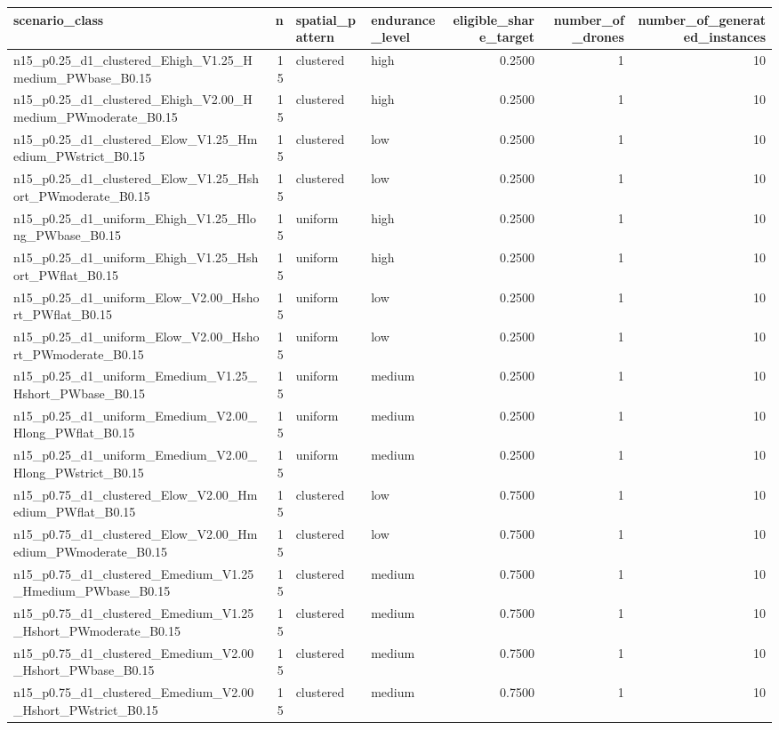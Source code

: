 \begin{tabular}{lrllrrr}
\toprule
scenario_class & n & spatial_pattern & endurance_level & eligible_share_target & number_of_drones & number_of_generated_instances \\
\midrule
n15_p0.25_d1_clustered_Ehigh_V1.25_Hmedium_PWbase_B0.15 & 15 & clustered & high & 0.2500 & 1 & 10 \\
n15_p0.25_d1_clustered_Ehigh_V2.00_Hmedium_PWmoderate_B0.15 & 15 & clustered & high & 0.2500 & 1 & 10 \\
n15_p0.25_d1_clustered_Elow_V1.25_Hmedium_PWstrict_B0.15 & 15 & clustered & low & 0.2500 & 1 & 10 \\
n15_p0.25_d1_clustered_Elow_V1.25_Hshort_PWmoderate_B0.15 & 15 & clustered & low & 0.2500 & 1 & 10 \\
n15_p0.25_d1_uniform_Ehigh_V1.25_Hlong_PWbase_B0.15 & 15 & uniform & high & 0.2500 & 1 & 10 \\
n15_p0.25_d1_uniform_Ehigh_V1.25_Hshort_PWflat_B0.15 & 15 & uniform & high & 0.2500 & 1 & 10 \\
n15_p0.25_d1_uniform_Elow_V2.00_Hshort_PWflat_B0.15 & 15 & uniform & low & 0.2500 & 1 & 10 \\
n15_p0.25_d1_uniform_Elow_V2.00_Hshort_PWmoderate_B0.15 & 15 & uniform & low & 0.2500 & 1 & 10 \\
n15_p0.25_d1_uniform_Emedium_V1.25_Hshort_PWbase_B0.15 & 15 & uniform & medium & 0.2500 & 1 & 10 \\
n15_p0.25_d1_uniform_Emedium_V2.00_Hlong_PWflat_B0.15 & 15 & uniform & medium & 0.2500 & 1 & 10 \\
n15_p0.25_d1_uniform_Emedium_V2.00_Hlong_PWstrict_B0.15 & 15 & uniform & medium & 0.2500 & 1 & 10 \\
n15_p0.75_d1_clustered_Elow_V2.00_Hmedium_PWflat_B0.15 & 15 & clustered & low & 0.7500 & 1 & 10 \\
n15_p0.75_d1_clustered_Elow_V2.00_Hmedium_PWmoderate_B0.15 & 15 & clustered & low & 0.7500 & 1 & 10 \\
n15_p0.75_d1_clustered_Emedium_V1.25_Hmedium_PWbase_B0.15 & 15 & clustered & medium & 0.7500 & 1 & 10 \\
n15_p0.75_d1_clustered_Emedium_V1.25_Hshort_PWmoderate_B0.15 & 15 & clustered & medium & 0.7500 & 1 & 10 \\
n15_p0.75_d1_clustered_Emedium_V2.00_Hshort_PWbase_B0.15 & 15 & clustered & medium & 0.7500 & 1 & 10 \\
n15_p0.75_d1_clustered_Emedium_V2.00_Hshort_PWstrict_B0.15 & 15 & clustered & medium & 0.7500 & 1 & 10 \\

\end{tabular}
